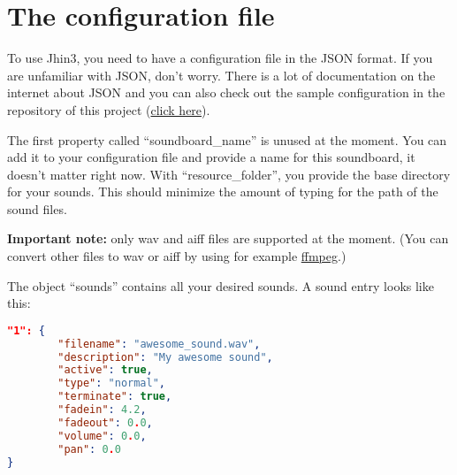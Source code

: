 \section{The configuration file}

To use Jhin3, you need to have a configuration file in the JSON format. If you are unfamiliar with JSON, don't worry. There is a lot of documentation on the internet about JSON and you can also check out the sample configuration in the repository of this project (\href{https://github.com/hannesbraun/jhin3/blob/master/sample_conf.json}{click here}).

The first property called ``soundboard\_name'' is unused at the moment. You can add it to your configuration file and provide a name for this soundboard, it doesn't matter right now.
With ``resource\_folder'', you provide the base directory for your sounds. This should minimize the amount of typing for the path of the sound files.

\textbf{Important note:} only wav and aiff files are supported at the moment. (You can convert other files to wav or aiff by using for example \href{https://ffmpeg.org}{ffmpeg}.)

The object ``sounds'' contains all your desired sounds. A sound entry looks like this:
\begin{lstlisting}[language=json]
"1": {
        "filename": "awesome_sound.wav",
        "description": "My awesome sound",
        "active": true,
        "type": "normal",
        "terminate": true,
        "fadein": 4.2,
        "fadeout": 0.0,
        "volume": 0.0,
        "pan": 0.0
}
\end{lstlisting}

